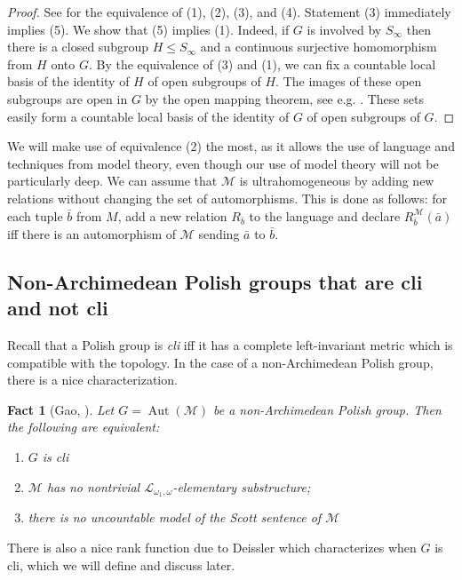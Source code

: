 \documentclass[12pt]{amsart}
\theoremstyle{plain}
\newtheorem{fact}[theorem]{Fact}
\theoremstyle{definition}
\newcommand{\mcL}{\mathcal{L}}
\newcommand{\mcM}{\mathcal{M}}
\DeclareMathOperator{\Aut}{Aut}
\begin{document}
\begin{proof}
See \cite[Theorem 2.4.1, Theorem 2.4.4]{Gao2008} for the equivalence of (1), (2), (3), and (4).
Statement (3) immediately implies (5).
We show that (5) implies (1).
Indeed, if $G$ is involved by $S_\infty$ then there is a closed subgroup $H \le S_\infty$ and a continuous surjective homomorphism from $H$ onto $G$.
By the equivalence of (3) and (1), we can fix a countable local basis of the identity of $H$ of open subgroups of $H$.
The images of these open subgroups are open in $G$ by the open mapping theorem, see e.g. \cite[Theorem 2.3.3]{Gao2008}.
These sets easily form a countable local basis of the identity of $G$ of open subgroups of $G$.
\end{proof}

We will make use of equivalence (2) the most, as it allows the use of language and techniques from model theory, even though our use of model theory will not be particularly deep.
We can assume that $\mcM$ is ultrahomogeneous by adding new relations without changing the set of automorphisms.
This is done as follows:
for each tuple $\bar{b}$ from $M$, add a new relation $R_{\bar{b}}$ to the language and declare $R_{\bar{b}}^\mcM(\bar{a})$ iff there is an automorphism of $\mcM$ sending $\bar{a}$ to $\bar{b}$.

\subsection{Non-Archimedean Polish groups that are cli and not cli}

Recall that a Polish group is \emph{cli} iff it has a complete left-invariant metric which is compatible with the topology.
In the case of a non-Archimedean Polish group, there is a nice characterization.

\begin{fact}[Gao, \cite{Gao1998}]
Let $G = \Aut(\mcM)$ be a non-Archimedean Polish group. Then the following are equivalent:
\begin{enumerate}
    \item $G$ is cli
    \item $\mcM$ has no nontrivial $\mcL_{\omega_1, \omega}$-elementary substructure;
    \item there is no uncountable model of the Scott sentence of $\mcM$
\end{enumerate}
\end{fact}
There is also a nice rank function due to Deissler which characterizes when $G$ is cli, which we will define and discuss later.
\end{document}
